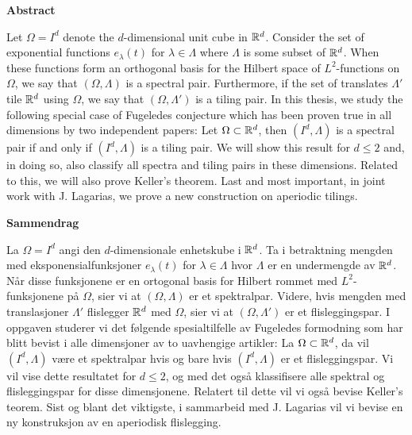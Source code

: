 





\begin{center}\textsf{\textbf{\large Abstract}}\end{center} 

Let $\Omega=I^d$ denote the $d$-dimensional unit cube in $\mathbb{R}^d$. Consider the set of exponential functions $e_\lambda(t)$ for $\lambda \in \Lambda$ where $\Lambda$ is some subset of $\mathbb{R}^d$. When these functions form an orthogonal basis for the Hilbert space of $L^2$-functions on $\Omega$, we say that $(\Omega,\Lambda)$ is a spectral pair. Furthermore, if the set of translates $\Lambda'$ tile $\mathbb{R}^d$ using $\Omega$, we say that $(\Omega,\Lambda')$ is a tiling pair. In this thesis, we study the following special case of Fugeledes conjecture which has been proven true in all dimensions by two independent papers: Let $\Omega\subset\mathbb{R}^d$, then $(I^d,\Lambda)$ is a spectral pair if and only if $(I^d,\Lambda)$ is a tiling pair. We will show this result for $d\leq2$ and, in doing so, also classify all spectra and tiling pairs in these dimensions. Related to this, we will also prove Keller's theorem. Last and most important, in joint work with J. Lagarias, we prove a new construction on aperiodic tilings. 

\begin{center}\textsf{\textbf{\large Sammendrag}}\end{center} 

La $\Omega=I^d$ angi den $d$-dimensionale enhetskube i $\mathbb{R}^d$. Ta i betraktning mengden med eksponensialfunksjoner $e_\lambda(t)$ for $\lambda \in \Lambda$ hvor $\Lambda$ er en undermengde av $\mathbb{R}^d$. Når disse funksjonene er en ortogonal basis for Hilbert rommet med $L^2$-funksjonene på $\Omega$, sier vi at $(\Omega,\Lambda)$ er et spektralpar. Videre, hvis mengden med translasjoner $\Lambda'$ flislegger $\mathbb{R}^d$ med $\Omega$, sier vi at $(\Omega,\Lambda')$ er et flisleggingspar. I oppgaven studerer vi det følgende spesialtilfelle av Fugeledes formodning som har blitt bevist i alle dimensjoner av to uavhengige artikler: La $\Omega\subset\mathbb{R}^d$, da vil $(I^d,\Lambda)$ være et spektralpar hvis og bare hvis $(I^d,\Lambda)$ er et flisleggingspar. Vi vil vise dette resultatet for $d\leq2$, og med det også klassifisere alle spektral og flisleggingspar for disse dimensjonene. Relatert til dette vil vi også bevise Keller's teorem. Sist og blant det viktigste, i sammarbeid med J. Lagarias vil vi bevise en ny konstruksjon av en aperiodisk flislegging.  


 